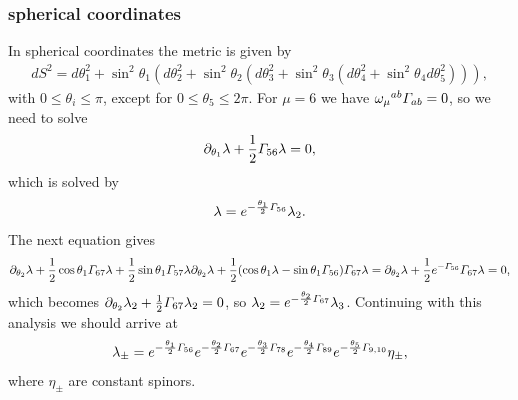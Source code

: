 \documentclass[11pt]{article}
\let\oldGamma=\Gamma
\renewcommand{\Gamma}{\mathnormal{\oldGamma}}
\newcommand{\sfrac}[2]{{\textstyle\frac{#1}{#2}}}
\newcommand{\p}{\partial}\newcommand{\quarter}{\sfrac{1}{4}}
\begin{document}
\subsubsection{spherical coordinates}
In spherical coordinates the metric is given by
\begin{align}
dS^2 = d\theta_1^2 + \sin^2\theta_1\left(d\theta_2^2 + \sin^2\theta_2\left(d\theta_3^2 + \sin^2\theta_3\left(d\theta_4^2 + \sin^2\theta_4 d\theta_5^2\right)\right)\right),
\end{align}
with $0\leq\theta_i\leq\pi$, except for $0\leq\theta_5\leq2\pi$.
For $\mu=6 $ we have $\omega_{\mu}{}^{ab}\Gamma_{ab} = 0$, so we need to solve
\begin{align}
\p_{\theta_1}\lambda + \frac{1}{2}\Gamma_{56}\lambda = 0,
\end{align}
which is solved by
\begin{align}
\lambda = e^{- \frac{\theta_1}{2}\Gamma_{56}}\lambda_2.
\end{align}
The next equation gives
\begin{align}
\p_{\theta_2}\lambda + \frac{1}{2}\cos\theta_1\Gamma_{67}\lambda+ \frac{1}{2}\sin\theta_1\Gamma_{57}\lambda
\p_{\theta_2}\lambda + \frac{1}{2}(\cos\theta_1\lambda-\sin\theta_1\Gamma_{56})\Gamma_{67}\lambda
=\p_{\theta_2}\lambda +\frac{1}{2}e^{-\Gamma_{56}}\Gamma_{67}\lambda = 0,
\end{align}
which becomes $\p_{\theta_2}\lambda_2 + \frac{1}{2}\Gamma_{67}\lambda_2 = 0$, so $\lambda_2 = e^{-\frac{\theta_2}{2}\Gamma_{67}}\lambda_3$.
Continuing with this analysis we should arrive at
\begin{align}
\lambda_{\pm} = e^{- \frac{\theta_1}{2}\Gamma_{56}}e^{- \frac{\theta_2}{2}\Gamma_{67}}e^{- \frac{\theta_3}{2}\Gamma_{78}}e^{- \frac{\theta_4}{2}\Gamma_{89}}e^{- \frac{\theta_5}{2}\Gamma_{9,10}}\eta_\pm,
\end{align}
where $\eta_\pm$ are constant spinors.
\end{document}
